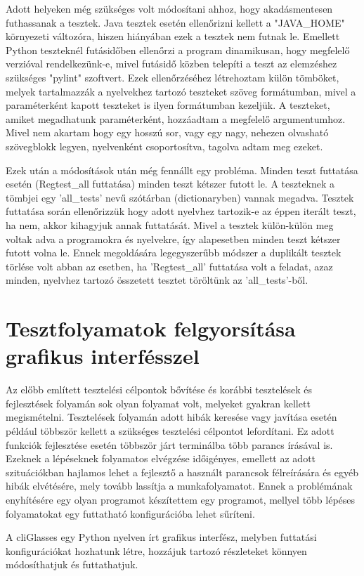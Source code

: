 Adott helyeken még szükséges volt módosítani ahhoz, hogy akadásmentesen futhassanak a tesztek. Java tesztek esetén ellenőrizni kellett a "JAVA\_HOME" környezeti változóra, hiszen hiányában ezek a tesztek nem futnak le. Emellett Python teszteknél futásidőben ellenőrzi a program dinamikusan, hogy megfelelő verzióval rendelkezünk-e, mivel futásidő közben telepíti a teszt az elemzéshez szükséges "pylint" szoftvert.
Ezek ellenőrzéséhez létrehoztam külön tömböket, melyek tartalmazzák a nyelvekhez tartozó teszteket szöveg formátumban, mivel a paraméterként kapott teszteket is ilyen formátumban kezeljük.
A teszteket, amiket megadhatunk paraméterként, hozzáadtam a megfelelő argumentumhoz. Mivel nem akartam hogy egy hosszú sor, vagy egy nagy, nehezen olvasható szövegblokk legyen, nyelvenként csoportosítva, tagolva adtam meg ezeket.

Ezek után a módosítások után még fennállt egy probléma. Minden teszt futtatása esetén (Regtest\_all futtatása) minden teszt kétszer futott le. A teszteknek a tömbjei egy 'all\_tests' nevű szótárban (dictionaryben) vannak megadva. Tesztek futtatása során ellenőrizzük hogy adott nyelvhez tartozik-e az éppen iterált teszt, ha nem, akkor kihagyjuk annak futtatását. Mivel a tesztek külön-külön meg voltak adva a programokra és nyelvekre, így alapesetben minden teszt kétszer futott volna le. Ennek megoldására legegyszerűbb módszer a duplikált tesztek törlése volt abban az esetben, ha 'Regtest\_all' futtatása volt a feladat, azaz minden, nyelvhez tartozó összetett tesztet töröltünk az 'all\_tests'-ből. 

\section{Tesztfolyamatok felgyorsítása grafikus interfésszel}

Az előbb említett tesztelési célpontok bővítése és korábbi tesztelések és fejlesztések folyamán sok olyan folyamat volt, melyeket gyakran kellett megismételni. Tesztelések folyamán adott hibák keresése vagy javítása esetén például többször kellett a szükséges tesztelési célpontot lefordítani. Ez adott funkciók fejlesztése esetén többször járt terminálba több parancs írásával is.
Ezeknek a lépéseknek folyamatos elvégzése időigényes, emellett az adott szituációkban hajlamos lehet a fejlesztő a használt parancsok félreírására és egyéb hibák elvétésére, mely tovább lassítja a munkafolyamatot. Ennek a problémának enyhítésére egy olyan programot készítettem egy programot, mellyel több lépéses folyamatokat egy futtatható konfigurációba lehet sűríteni.

A cliGlasses egy Python nyelven írt grafikus interfész, melyben futtatási konfigurációkat hozhatunk létre, hozzájuk tartozó részleteket könnyen módosíthatjuk és futtathatjuk. 
